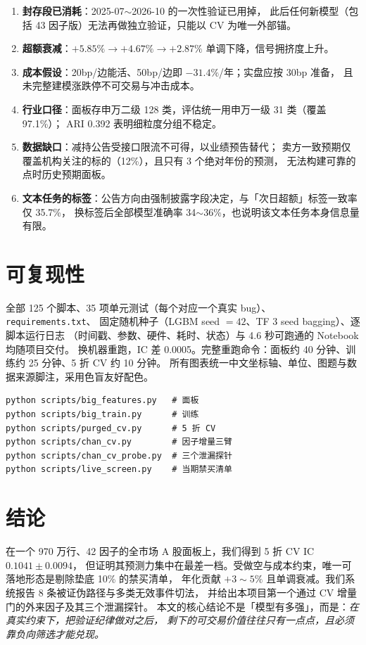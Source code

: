 \documentclass[sigconf]{acmart}
\begin{document}
\begin{enumerate}
  \item \textbf{封存段已消耗}：2025-07$\sim$2026-10 的一次性验证已用掉，
  此后任何新模型（包括 43 因子版）无法再做独立验证，只能以 CV 为唯一外部锚。
  \item \textbf{超额衰减}：$+5.85\% \to +4.67\% \to +2.87\%$ 单调下降，信号拥挤度上升。
  \item \textbf{成本假设}：20bp/边能活、50bp/边即 $-31.4\%$/年；实盘应按 30bp 准备，
  且未完整建模涨跌停不可交易与冲击成本。
  \item \textbf{行业口径}：面板存申万二级 128 类，评估统一用申万一级 31 类（覆盖 97.1\%）；
  ARI 0.392 表明细粒度分组不稳定。
  \item \textbf{数据缺口}：减持公告受接口限流不可得，以业绩预告替代；
  卖方一致预期仅覆盖机构关注的标的（12\%），且只有 3 个绝对年份的预测，
  无法构建可靠的点时历史预期面板。
  \item \textbf{文本任务的标签}：公告方向由强制披露字段决定，与「次日超额」标签一致率仅 35.7\%，
  换标签后全部模型准确率 34$\sim$36\%，也说明该文本任务本身信息量有限。
\end{enumerate}

\section{可复现性}

全部 125 个脚本、35 项单元测试（每个对应一个真实 bug）、\texttt{requirements.txt}、
固定随机种子（LGBM seed $=42$、TF 3 seed bagging）、逐脚本运行日志
（时间戳、参数、硬件、耗时、状态）与 4.6 秒可跑通的 Notebook 均随项目交付。
换机器重跑，IC 差 0.0005。完整重跑命令：面板约 40 分钟、训练约 25 分钟、5 折 CV 约 10 分钟。
所有图表统一中文坐标轴、单位、图题与数据来源脚注，采用色盲友好配色。

\begin{verbatim}
python scripts/big_features.py   # 面板
python scripts/big_train.py      # 训练
python scripts/purged_cv.py      # 5 折 CV
python scripts/chan_cv.py        # 因子增量三臂
python scripts/chan_cv_probe.py  # 三个泄漏探针
python scripts/live_screen.py    # 当期禁买清单
\end{verbatim}

\section{结论}

在一个 970 万行、42 因子的全市场 A 股面板上，我们得到 5 折 CV IC $0.1041 \pm 0.0094$，
但证明其预测力集中在最差一档。受做空与成本约束，唯一可落地形态是剔除垫底 10\% 的禁买清单，
年化贡献 $+3\sim5\%$ 且单调衰减。我们系统报告 8 条被证伪路径与多类无效事件切法，
并给出本项目第一个通过 CV 增量门的外来因子及其三个泄漏探针。
本文的核心结论不是「模型有多强」，而是：\emph{在真实约束下，把验证纪律做对之后，
剩下的可交易价值往往只有一点点，且必须靠负向筛选才能兑现。}
\end{document}
